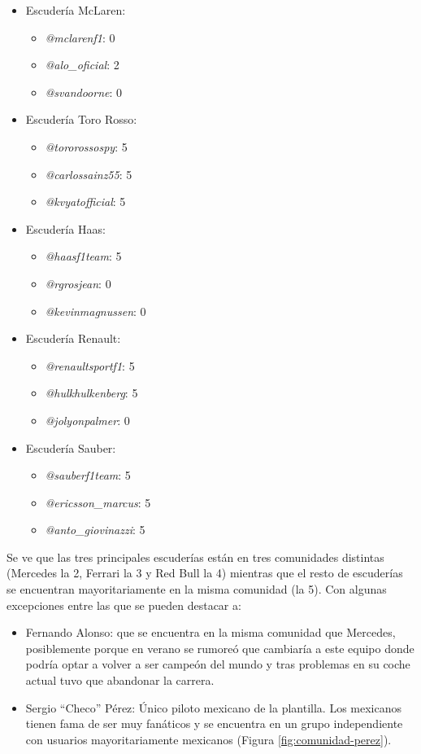 \begin{itemize}
	\item Escudería McLaren:
	\begin{itemize}
		\item \textit{@mclarenf1}: 0
		\item \textit{@alo\_oficial}: 2
		\item \textit{@svandoorne}: 0
	\end{itemize}

	\item Escudería Toro Rosso:
	\begin{itemize}
		\item \textit{@tororossospy}: 5
		\item \textit{@carlossainz55}: 5
		\item \textit{@kvyatofficial}: 5
	\end{itemize}

	\item Escudería Haas:
	\begin{itemize}
		\item \textit{@haasf1team}: 5
		\item \textit{@rgrosjean}: 0
		\item \textit{@kevinmagnussen}: 0
	\end{itemize}

	\item Escudería Renault:
	\begin{itemize}
		\item \textit{@renaultsportf1}: 5
		\item \textit{@hulkhulkenberg}: 5
		\item \textit{@jolyonpalmer}: 0
	\end{itemize}

	\item Escudería Sauber:
	\begin{itemize}
		\item \textit{@sauberf1team}: 5
		\item \textit{@ericsson\_marcus}: 5
		\item \textit{@anto\_giovinazzi}: 5
	\end{itemize}
\end{itemize} 

Se ve que las tres principales escuderías están en tres comunidades distintas (Mercedes la 2, Ferrari la 3 y Red Bull la 4) mientras que el resto de escuderías se encuentran mayoritariamente en la misma comunidad (la 5). Con algunas excepciones entre las que se pueden destacar a:

\begin{itemize}
	\item Fernando Alonso: que se encuentra en la misma comunidad que Mercedes, posiblemente porque en verano se rumoreó que cambiaría a este equipo donde podría optar a volver a ser campeón del mundo y tras problemas en su coche actual tuvo que abandonar la carrera.
	\item Sergio ``Checo'' Pérez: Único piloto mexicano de la plantilla. Los mexicanos tienen fama de ser muy fanáticos y se encuentra en un grupo independiente con usuarios mayoritariamente mexicanos (Figura \ref{fig:comunidad-perez}).
\end{itemize}
 
